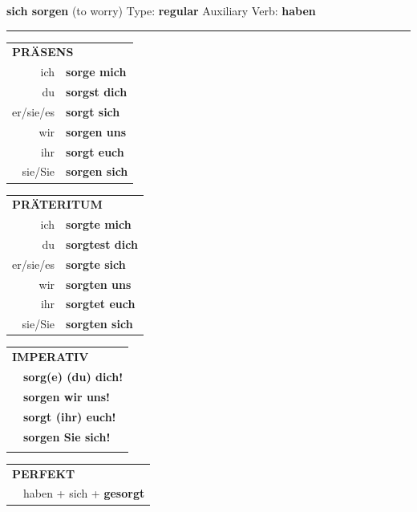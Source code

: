 \documentclass[10pt,a4paper]{revtex4-2}
\begin{document}
\begin{verbbox}
        {\Large \bf sich sorgen} (to worry) \hfill Type: \textbf{regular} \hfill Auxiliary Verb: \textbf{haben} 
    
       \vspace{5pt}

    \hrule
    
    \vspace{5pt}

  \begin{tabular}{rl}
     \multicolumn{2}{l}{\textbf{PRÄSENS} }\\
    ich & \textbf{sorge mich}\\
    du & \textbf{sorgst dich}\\
    er/sie/es & \textbf{sorgt sich}\\
    wir & \textbf{sorgen uns}\\
    ihr & \textbf{sorgt euch}\\
    sie/Sie & \textbf{sorgen sich}\\
  \end{tabular}
  \hfill
     \begin{tabular}{rl}
    \multicolumn{2}{l}{\textbf{PRÄTERITUM} }\\
    ich & \textbf{sorgte mich}\\
    du & \textbf{sorgtest dich}\\
    er/sie/es & \textbf{sorgte sich}\\
    wir & \textbf{sorgten uns}\\
    ihr & \textbf{sorgtet euch}\\
    sie/Sie & \textbf{sorgten sich}\\
  \end{tabular}
  \hfill
  \begin{tabular}{rl}
     \multicolumn{2}{l}{\textbf{IMPERATIV} }\\
   & \textbf{sorg(e) (du) dich!}\\
   & \textbf{sorgen wir uns!}\\
   & \textbf{sorgt (ihr) euch!}\\
   & \textbf{sorgen Sie sich!}\\
   & \vspace{10pt}
  \end{tabular}

    \vspace{10pt}

 \begin{tabular}{rl}
     \multicolumn{2}{l}{\textbf{PERFEKT}}\\
    &haben + sich + \textbf{gesorgt}\\
  \end{tabular}
\hfill
   \begin{tabular}{rl}
   

\end{tabular}
\end{verbbox}
\end{document}
